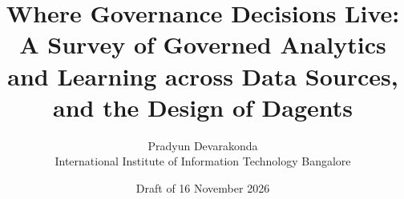 \documentclass[11pt]{article}
\title{Where Governance Decisions Live:\\
A Survey of Governed Analytics and Learning across Data Sources,\\
and the Design of Dagents}
\author{Pradyun Devarakonda\\
\small International Institute of Information Technology Bangalore}
\date{Draft of 16 November 2026}
\begin{document}
\maketitle

\begin{abstract}

\end{abstract}















\appendix

\end{document}
